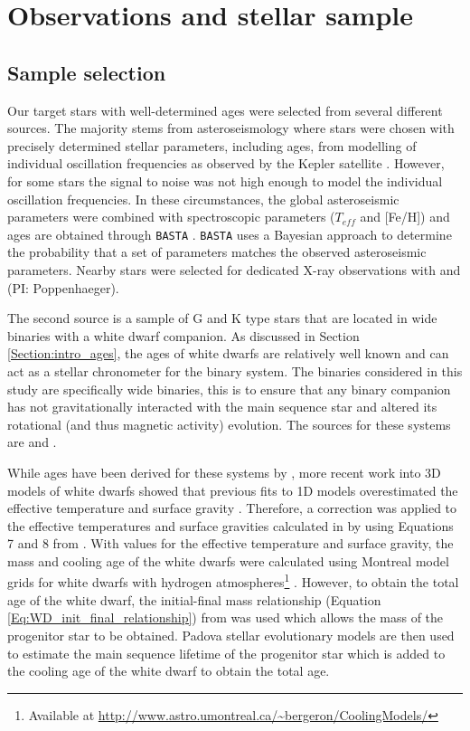 \section{Observations and stellar sample}
\subsection{Sample selection}
\label{Section_sample_selection}
Our target stars with well-determined ages were selected from several different sources. The majority stems from asteroseismology where stars were chosen with precisely determined stellar parameters, including ages, from modelling of individual oscillation frequencies as observed by the Kepler satellite \citep{Silva_Aguirre_etal_2015,Silva_Aguirre_etal_2017}. However, for some stars the signal to noise was not high enough to model the individual oscillation frequencies. In these circumstances, the global asteroseismic parameters \citep{Chaplin_etal_2014} were combined with spectroscopic parameters ($T_{eff}$ and [Fe/H]) \citep{Buchhave_Latham_2015} and ages are obtained through \texttt{BASTA} \citep{Silva_Aguirre_etal_2015}. \texttt{BASTA} uses a Bayesian approach to determine the probability that a set of parameters matches the observed asteroseismic parameters. Nearby stars were selected for dedicated X-ray observations with \XMM and \Chandra (PI: Poppenhaeger).

The second source is a sample of G and K type stars that are located in wide binaries with a white dwarf companion. As discussed in Section \ref{Section:intro_ages}, the ages of white dwarfs are relatively well known and can act as a stellar chronometer for the binary system. The binaries considered in this study are specifically wide binaries, this is to ensure that any binary companion has not gravitationally interacted with the main sequence star and altered its rotational (and thus magnetic activity) evolution. The sources for these systems are \citet{Garces_etal_2011} and \citet{Zhao_etal_2012}.

While ages have been derived for these systems by \citet{Garces_etal_2011}, more recent work into 3D models of white dwarfs showed that previous fits to 1D models overestimated the effective temperature and surface gravity \citep{Tremblay_etal_2013}. Therefore, a correction was applied to the effective temperatures and surface gravities calculated in \citet{Garces_etal_2011} by using Equations 7 and 8 from \citet{Tremblay_etal_2013}. With values for the effective temperature and surface gravity, the mass and cooling age of the white dwarfs were calculated using Montreal model grids for white dwarfs with hydrogen atmospheres\footnote{Available at \url{http://www.astro.umontreal.ca/~bergeron/CoolingModels/}} \citep{Holberg_Bergeron_2006,Kowalski_Saumon_2006,Bergeron_etal_2011,Tremblay_etal_2011}. However, to obtain the total age of the white dwarf, the initial-final mass relationship (Equation \ref{Eq:WD_init_final_relationship}) from \citet{Kalirai_etal_2008} was used which allows the mass of the progenitor star to be obtained. Padova stellar evolutionary models \citep{Bertelli_etal_2008} are then used to estimate the main sequence lifetime of the progenitor star which is added to the cooling age of the white dwarf to obtain the total age.

